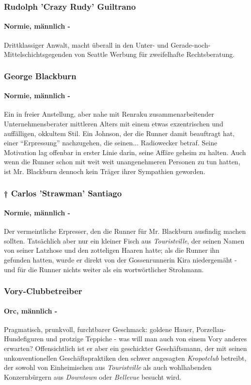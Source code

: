     
    \subsubsection{Rudolph 'Crazy Rudy' Guiltrano}
    \paragraph{Normie, männlich -} Drittklassiger Anwalt, macht überall in den Unter- und Gerade-noch-Mittelschichtsgegenden von Seattle Werbung für zweifelhafte Rechtsberatung. 
    
    
    \subsubsection{George Blackburn}
    \paragraph{Normie, männlich -} Ein in freier Anstellung, aber nahe mit Renraku zusammenarbeitender Unternehmensberater mittleren Alters mit einem etwas exzentrischen und auffälligen, okkultem Stil. Ein Johnson, der die Runner damit beauftragt hat, einer ``Erpressung'' nachzugehen, die seinen... Radiowecker betraf. Seine Motivation lag offenbar in erster Linie darin, seine Affäre geheim zu halten. Auch wenn die Runner schon mit weit weit unangenehmeren Personen zu tun hatten, ist Mr. Blackburn dennoch kein Träger ihrer Sympathien geworden.
    
    \subsubsection{\textsf{†} Carlos 'Strawman' Santiago}
    \paragraph{Normie, männlich -} Der vermeintliche Erpresser, den die Runner für Mr. Blackburn ausfindig machen sollten. Tatsächlich aber nur ein kleiner Fisch aus \textit{Touristville}, der seinen Namen von seiner Latzhose und den zotteligen Haaren hatte; als die Runner ihn gefunden hatten, wurde er direkt von der Gossenrunnerin Kira niedergemäht - und für die Runner nichts weiter als ein wortwörtlicher Strohmann.
    
    \subsubsection{Vory-Clubbetreiber}
    \paragraph{Orc, männlich -} Pragmatisch, prunkvoll, furchtbarer Geschmack: goldene Hauer, Porzellan-Hundefiguren und protzige Teppiche - was will man auch von einem Vory anderes erwarten? Offensichtlich ist er aber ein geschickter Geschäftsmann, der mit seinen unkonventionellen Geschäftspraktiken den schwer angesagten \textit{Kropotclub} betreibt, der sowohl von Einheimischen aus \textit{Touristville} als auch wohlhabenden Konzernbürgern aus \textit{Downtown} oder \textit{Bellevue} besucht wird.
    
